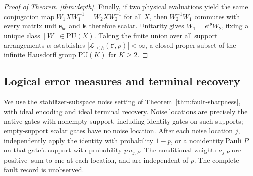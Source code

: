 \documentclass[aps,prl,reprint,notitlepage,nofootinbib,nobibnotes]{revtex4-2}
\newcommand{\PU}{\mathrm{PU}}
\begin{document}
\begin{proof}[Proof of Theorem~\ref{thm:depth}]
Finally, if two physical evaluations yield the same conjugation map $W_1XW_1^{-1}=W_2XW_2^{-1}$ for
all $X$, then $W_2^{-1}W_1$ commutes with every matrix unit $\mathsf e_{bc}$ and is therefore
scalar. Unitarity gives $W_1=e^{i\theta}W_2$, fixing a unique class $[W]\in\PU(K)$. Taking the
finite union over all support arrangements $\alpha$ establishes $|\mathcal L_{\le h}(\mathcal
C,\rho)|<\infty$, a closed proper subset of the infinite Hausdorff group $\PU(K)$ for $K\ge2$.
\end{proof}

\subsection*{Logical error measures and terminal recovery}
\label{sm:logical-error-measures}

We use the stabilizer-subspace noise setting of Theorem~\ref{thm:fault-sharpness}, with ideal
encoding and ideal terminal recovery. Noise locations are precisely the native gates with nonempty support, including identity gates on such supports; empty-support scalar gates have no noise location. After each noise location $j$, independently apply
the identity with probability $1-p$, or a nonidentity Pauli $P$ on that gate's support with
probability $p\,a_{j,P}$. The conditional weights $a_{j,P}$ are positive, sum to one at each
location, and are independent of $p$. The complete fault record is unobserved.
\end{document}
